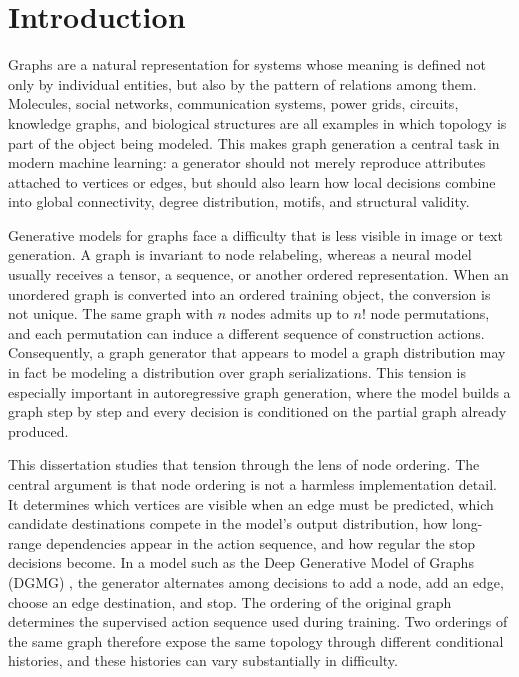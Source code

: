 \chapter{Introduction}
\label{chap:introduction}

Graphs are a natural representation for systems whose meaning is defined not only by individual entities, but also by the pattern of relations among them. Molecules, social networks, communication systems, power grids, circuits, knowledge graphs, and biological structures are all examples in which topology is part of the object being modeled. This makes graph generation a central task in modern machine learning: a generator should not merely reproduce attributes attached to vertices or edges, but should also learn how local decisions combine into global connectivity, degree distribution, motifs, and structural validity.

Generative models for graphs face a difficulty that is less visible in image or text generation. A graph is invariant to node relabeling, whereas a neural model usually receives a tensor, a sequence, or another ordered representation. When an unordered graph is converted into an ordered training object, the conversion is not unique. The same graph with $n$ nodes admits up to $n!$ node permutations, and each permutation can induce a different sequence of construction actions. Consequently, a graph generator that appears to model a graph distribution may in fact be modeling a distribution over graph serializations. This tension is especially important in autoregressive graph generation, where the model builds a graph step by step and every decision is conditioned on the partial graph already produced.

This dissertation studies that tension through the lens of node ordering. The central argument is that node ordering is not a harmless implementation detail. It determines which vertices are visible when an edge must be predicted, which candidate destinations compete in the model's output distribution, how long-range dependencies appear in the action sequence, and how regular the stop decisions become. In a model such as the Deep Generative Model of Graphs (DGMG) \cite{li2018learning}, the generator alternates among decisions to add a node, add an edge, choose an edge destination, and stop. The ordering of the original graph determines the supervised action sequence used during training. Two orderings of the same graph therefore expose the same topology through different conditional histories, and these histories can vary substantially in difficulty.

